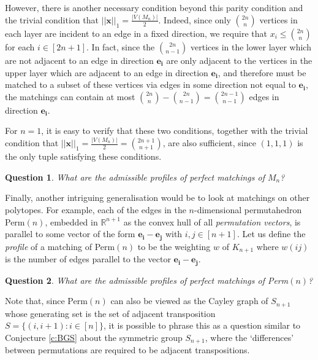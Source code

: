 \documentclass{article}
\newtheorem{question}{Question}
\begin{document}
However, there is another necessary condition beyond this parity condition and the trivial condition that $||\bm{x}||_1 = \frac{|V(M_n)|}{2}$. Indeed, since only $\binom{2n}{n}$ vertices in each layer are incident to an edge in a fixed direction,  we require that $x_i \leq \binom{2n}{n}$ for each $i \in [2n+1]$. In fact, since the $\binom{2n}{n-1}$ vertices in the lower layer which are not adjacent to an edge in direction $\bm{e_i}$ are only adjacent to the vertices in the upper layer which are adjacent to an edge in direction $\bm{e_i}$, and therefore must be matched to a subset of these vertices via edges in some direction not equal to $\bm{e_i}$, the matchings can contain at most $\binom{2n}{n} - \binom{2n}{n-1} = \binom{2n-1}{n-1}$ edges in direction $\bm{e_i}$.

For $n=1$, it is easy to verify that these two conditions, together with the trivial condition that $||\bm{x}||_1 = \frac{|V(M_n)|}{2} = \binom{2n+1}{n+1}$, are also sufficient, since $(1,1,1)$ is the only tuple satisfying these conditions.

\begin{question}
What are the admissible profiles of perfect matchings of $M_n$? 
\end{question}

Finally, another intriguing generalisation would be to look at matchings on other polytopes. For example, each of the edges in the $n$-dimensional permutahedron Perm$(n)$, embedded in $\mathbb{R}^{n+1}$ as the convex hull of all \emph{permutation vectors}, is parallel to some vector of the form $\bm{e_i} - \bm{e_j}$ with $i,j \in [n+1]$. Let us define the \emph{profile} of a matching of Perm$(n)$ to be the weighting $w$ of $K_{n+1}$ where $w(ij)$ is the number of edges parallel to the vector $\bm{e_i} - \bm{e_j}$.
\begin{question}
What are the admissible profiles of perfect matchings of Perm$(n)$?
\end{question}
Note that, since Perm$(n)$ can also be viewed as the Cayley graph of $S_{n+1}$ whose generating set is the set of adjacent transposition $S = \{ (i,i+1) \colon i \in [n]\}$, it is possible to phrase this as a question similar to Conjecture \ref{c:BGS} about the symmetric group $S_{n+1}$, where the `differences' between permutations are required to be adjacent transpositions.
\end{document}
